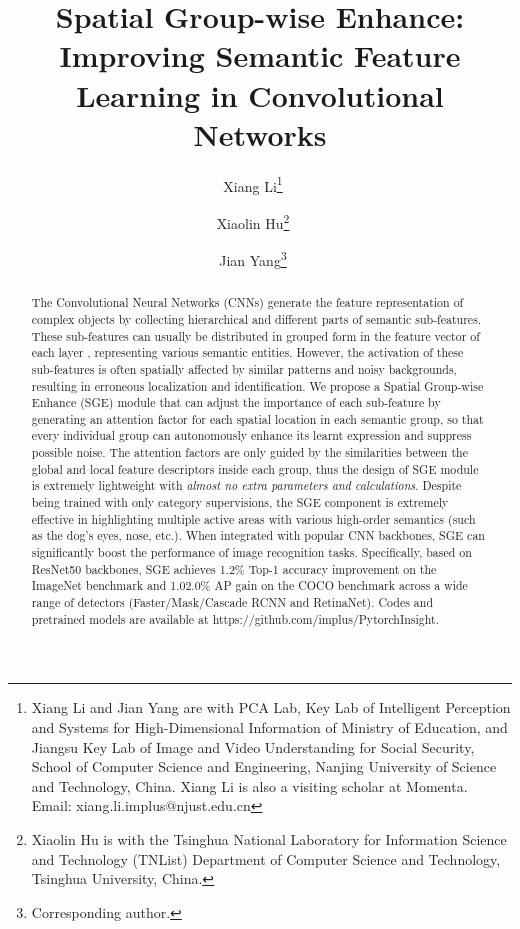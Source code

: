 \documentclass{article}
\title{Spatial Group-wise Enhance: Improving Semantic Feature Learning in Convolutional Networks}
\author[1,2]{Xiang Li\thanks{Xiang Li and Jian Yang are with PCA Lab, Key Lab of Intelligent Perception and Systems for High-Dimensional Information of Ministry of Education, and Jiangsu Key Lab of Image and Video Understanding for Social Security, School of Computer Science and Engineering, Nanjing University of Science and Technology, China. Xiang Li is also a visiting scholar at Momenta. Email: xiang.li.implus@njust.edu.cn}\ \ }
\author[3]{Xiaolin Hu\thanks{Xiaolin Hu is with the Tsinghua National Laboratory for Information Science and Technology (TNList) Department of Computer Science and Technology, Tsinghua University, China.}\ \ }
\author[1]{Jian Yang\thanks{Corresponding author.}\ \ }
\affil[1]{PCALab, Nanjing University of Science and Technology}
\affil[2]{Momenta}
\affil[3]{Tsinghua University}
\begin{document}
	
	\maketitle
	
	\begin{abstract}
		The Convolutional Neural Networks (CNNs) generate the feature representation of complex objects by collecting hierarchical and different parts of semantic sub-features. These sub-features can usually be distributed in grouped form in the feature vector of each layer \cite{wu2018group,sabour2017dynamic}, representing various semantic entities. However, the activation of these sub-features is often spatially affected by similar patterns and noisy backgrounds, resulting in erroneous localization and identification. We propose a Spatial Group-wise Enhance (SGE) module that can adjust the importance of each sub-feature by generating an attention factor for each spatial location in each semantic group, so that every individual group can autonomously enhance its learnt expression and suppress possible noise. The attention factors are only guided by the similarities between the global and local feature descriptors inside each group, thus the design of SGE module is extremely lightweight with \emph{almost no extra parameters and calculations}. Despite being trained with only category supervisions, the SGE component is extremely effective in highlighting multiple active areas with various high-order semantics (such as the dog's eyes, nose, etc.). When integrated with popular CNN backbones, SGE can significantly boost the performance of image recognition tasks. Specifically, based on ResNet50 backbones, SGE achieves 1.2\% Top-1 accuracy improvement on the ImageNet benchmark and 1.02.0\% AP gain on the COCO benchmark across a wide range of detectors (Faster/Mask/Cascade RCNN and RetinaNet). Codes and pretrained models are available at https://github.com/implus/PytorchInsight.
	\end{abstract}
	
\end{document}
